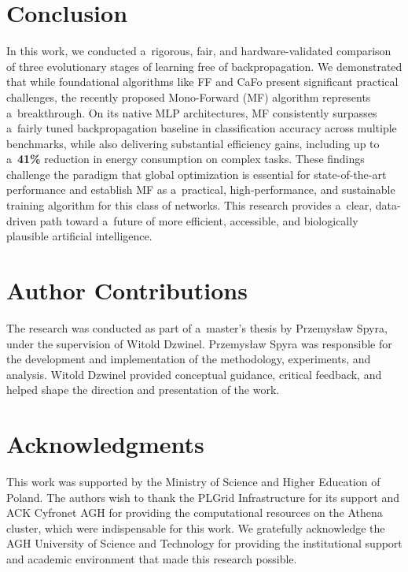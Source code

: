 \documentclass[letterpaper]{article}
\begin{document}
\section{Conclusion}

In this work, we conducted a~rigorous, fair, and hardware-validated comparison of three evolutionary stages of learning free of backpropagation. We demonstrated that while foundational algorithms like FF and CaFo present significant practical challenges, the recently proposed Mono-Forward (MF) algorithm represents a~breakthrough. On its native MLP architectures, MF consistently surpasses a~fairly tuned backpropagation baseline in classification accuracy across multiple benchmarks, while also delivering substantial efficiency gains, including up to a~\textbf{41\%} reduction in energy consumption on complex tasks. These findings challenge the paradigm that global optimization is essential for state-of-the-art performance and establish MF as a~practical, high-performance, and sustainable training algorithm for this class of networks. This research provides a~clear, data-driven path toward a~future of more efficient, accessible, and biologically plausible artificial intelligence.

\section*{Author Contributions}

The research was conducted as part of a~master's thesis by Przemysław Spyra, under the supervision of Witold Dzwinel. Przemysław Spyra was responsible for the development and implementation of the methodology, experiments, and analysis. Witold Dzwinel provided conceptual guidance, critical feedback, and helped shape the direction and presentation of the work.

\section*{Acknowledgments}

This work was supported by the Ministry of Science and Higher Education of Poland. The authors wish to thank the PLGrid Infrastructure for its support and ACK Cyfronet AGH for providing the computational resources on the Athena cluster, which were indispensable for this work. We gratefully acknowledge the AGH University of Science and Technology for providing the institutional support and academic environment that made this research possible.
\end{document}
